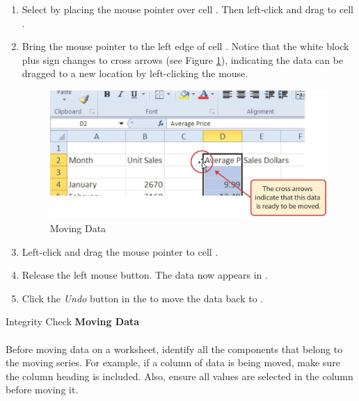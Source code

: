 \begin{enumbox}
	\begin{enumerate}
		\item Select  by placing the mouse pointer over cell . Then left-click and drag to cell .
		\item Bring the mouse pointer to the left edge of cell . Notice that the white block plus sign changes to cross arrows (see Figure \ref{01:fig30}), indicating the data can be dragged to a new location by left-clicking the mouse.
	
		\begin{figure}[H]
			\centering
			\includegraphics[width=\maxwidth{.95\linewidth}]{gfx/ch01_fig30}
			\caption{Moving Data}
			\label{01:fig30}
		\end{figure}

		\item Left-click and drag the mouse pointer to cell .
		\item Release the left mouse button. The data now appears in .
		\item Click the \textit{Undo} button in the  to move the data back to .
	\end{enumerate}
\end{enumbox}

\begin{center}
	\begin{infobox}{Integrity Check}
		\textbf{Moving Data}
		\\
		\\
		Before moving data on a worksheet, identify all the components that belong to the moving series. For example, if a column of data is being moved, make sure the column heading is included. Also, ensure all values are selected in the column before moving it.
	\end{infobox}
\end{center}



